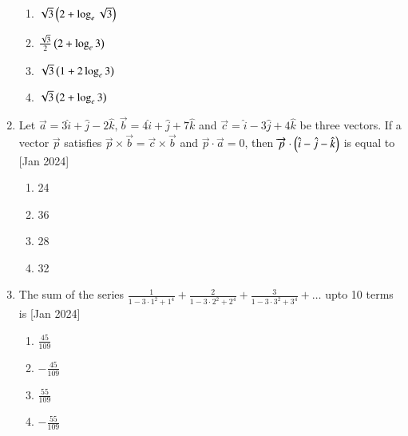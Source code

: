 \documentclass[journal]{IEEEtran}
\begin{document}
\begin{enumerate}
    \begin{multicols}{2}
\begin{enumerate}

        \item $\sqrt{3}\left(2 + \log_e \sqrt{3}\right)$
        \item $\frac{\sqrt{3}}{2}\left(2 + \log_e 3\right)$
        \item $\sqrt{3}\left(1 + 2 \log_e 3\right)$
        \item $\sqrt{3}\left(2 + \log_e 3\right)$
    \end{enumerate}
\end{multicols}

    \item Let $\overrightarrow{a} = 3\hat{i} + \hat{j} - 2\hat{k}, \overrightarrow{b} = 4\hat{i} + \hat{j} + 7\hat{k}$
    and $\overrightarrow{c} = \hat{i} - 3\hat{j} + 4\hat{k}$ be three vectors. If a
    vector $\overrightarrow{p}$ satisfies $\overrightarrow{p} \times \overrightarrow{b} = \overrightarrow{c} \times \overrightarrow{b}$
    and $\overrightarrow{p} \cdot \overrightarrow{a} = 0$, then $\overrightarrow{p} \cdot \left(\hat{i} - \hat{j} - \hat{k}\right)$
    is equal to
    \hfill{[Jan 2024]}

    \begin{multicols}{4}
\begin{enumerate}

        \item 24
        \item 36
        \item 28
        \item 32
    \end{enumerate}
\end{multicols}

    \item The sum of the series $\frac{1}{1-3\cdot 1^2+1^4}+\frac{2}{1-3\cdot 2^2+2^4}
    +\frac{3}{1-3\cdot 3^2+3^4} + \dots$ upto 10 terms is
    \hfill{[Jan 2024]}

    \begin{multicols}{4}
\begin{enumerate}

        \item $\frac{45}{109}$
        \item $-\frac{45}{109}$
        \item $\frac{55}{109}$
        \item $-\frac{55}{109}$
    \end{enumerate}
\end{multicols}


\end{enumerate}
\end{document}
